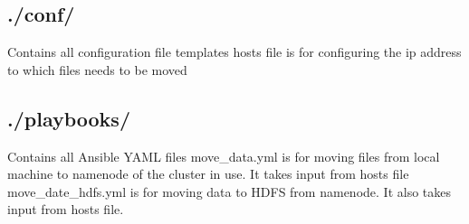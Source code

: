 \documentclass[9pt,twocolumn,twoside]{../../styles/osajnl}
\begin{document}
\subsection{./conf/} Contains all configuration file templates
\newline hosts file is for configuring the ip address to which files needs to be moved
\subsection{./playbooks/} Contains all Ansible YAML files
\newline move\_data.yml is for moving files from local machine to namenode of the cluster in use. It takes input from hosts file
\newline move\_date\_hdfs.yml is for moving data to HDFS from namenode. It also takes input from hosts file.
\end{document}
